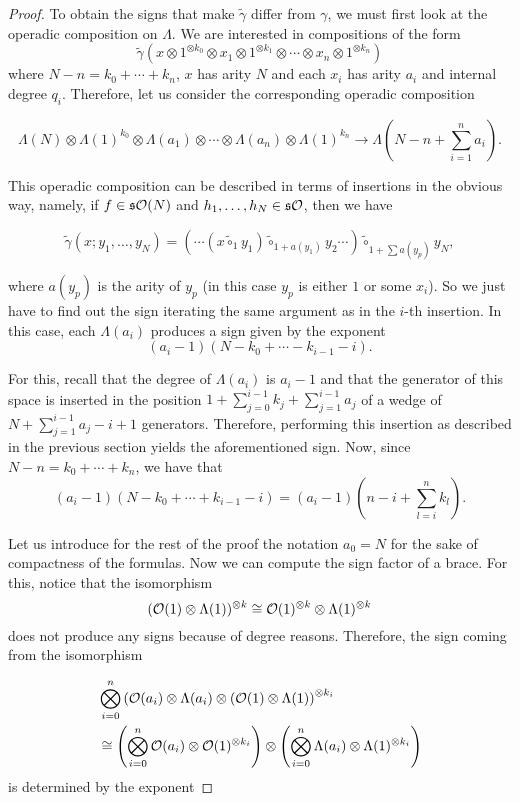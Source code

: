 \documentclass[Thesis.tex]{subfiles}
\begin{document}
\begin{proof}
To obtain the signs that make $\tilde{\gamma}$ differ from $\gamma$, we must first look at the operadic composition on $\Lambda$. 
We are interested in compositions of the form \[\tilde{\gamma}(x\otimes 1^{\otimes k_0}\otimes x_1\otimes 1^{\otimes k_1}\otimes\cdots\otimes x_n\otimes 1^{\otimes k_n})\] where $N-n=k_0+\cdots+k_n$, $x$ has arity $N$ and each $x_i$ has arity $a_i$ and internal degree $q_i$. Therefore, let us consider the corresponding operadic composition 

\[
\Lambda(N)\otimes\Lambda(1)^{k_0}\otimes\Lambda(a_1)\otimes\cdots\otimes\Lambda(a_n)\otimes\Lambda(1)^{k_n}\longrightarrow \Lambda\left(N-n+\sum_{i=1}^na_i\right).
\]

This operadic composition can be described in terms of insertions in the obvious way, namely, if $f\in\mathfrak{s}{\mathcal O}(N)$ and $h_1,\dots, h_N\in\mathfrak{s}{\mathcal O}$, then we have

\[\tilde{\gamma}(x;y_1,\dots, y_N)=(\cdots(x\tilde{\circ}_1 y_1)\tilde{\circ}_{1+a(y_1)}y_2\cdots)\tilde{\circ}_{1+\sum a(y_p)}y_N,\]

where $a(y_p)$ is the arity of $y_p$ (in this case $y_p$ is either $1$ or some $x_i$). So we just have to find out the sign iterating the same argument as in the $i$-th insertion. In this case, each $\Lambda(a_i)$ produces a sign given by the exponent $$(a_i-1)(N-k_0+\cdots-k_{i-1}-i).$$ 

For this, recall that the degree of $\Lambda(a_i)$ is $a_i-1$ and that the generator of this space is inserted in the position $1+\sum_{j=0}^{i-1}k_j+\sum_{j=1}^{i-1}a_j$ of a wedge of $N+\sum_{j=1}^{i-1}a_j-i+1$ generators. Therefore, performing this insertion as described in the previous section yields the aforementioned sign. Now, since $N-n=k_0+\cdots+k_n$, we have that
\[(a_i-1)(N-k_0+\cdots+k_{i-1}-i)=(a_i-1)\left(n-i+\sum_{l=i}^nk_l\right).\]

Let us introduce for the rest of the proof the notation $a_0 = N$ for the sake of compactness of the formulas. Now we can compute the sign factor of a brace. For this, notice that the isomorphism \[({\mathcal O}(1)\otimes \Lambda(1))^{\otimes k}\cong {\mathcal O}(1)^{\otimes k}\otimes \Lambda(1)^{\otimes k}\] does not produce any signs because of degree reasons. Therefore, the sign coming from the isomorphism

\begin{align*}
&\bigotimes_{i=0}^n\left({\mathcal O}(a_i)\otimes\Lambda(a_i)\otimes({\mathcal O}(1)\otimes\Lambda(1)\right)^{\otimes k_i}\\
&\cong \left(\bigotimes_{i=0}^n {\mathcal O}(a_i)\otimes {\mathcal O}(1)^{\otimes k_i}\right)\otimes \left(\bigotimes_{i=0}^n \Lambda(a_i)\otimes \Lambda(1)^{\otimes k_i}\right)
\end{align*}
is determined by the exponent


\end{proof}
\end{document}
